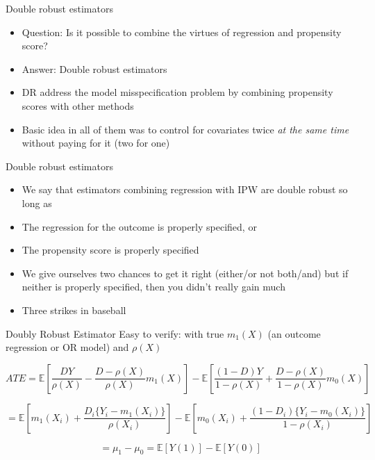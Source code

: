 \documentclass{beamer}
\begin{document}
\begin{frame}{Double robust estimators}

\begin{itemize}
\item Question: Is it possible to combine the virtues of regression and propensity score?
\item Answer: Double robust estimators
\item DR address the model misspecification problem by combining propensity scores with other methods 
\item Basic idea in all of them was to control for covariates twice \emph{at the same time} without paying for it (two for one)
\end{itemize}

\end{frame}

\begin{frame}{Double robust estimators}

\begin{itemize}
\item We say that estimators combining regression with IPW are double robust so long as
	\item The regression for the outcome is properly specified, or
	\item The propensity score is properly specified
\item We give ourselves two chances to get it right (either/or not both/and) but if neither is properly specified, then you didn't really gain much
\item Three strikes in baseball
\end{itemize}

\end{frame}

\begin{frame}{Doubly Robust Estimator}
    Easy to verify: with true \( m_1(X) \) (an outcome regression or OR model) and \( \rho(X) \)
\footnotesize

    \[
    ATE = \mathbb{E} \left[ \frac{DY}{\rho(X)} - \frac{D - \rho(X)}{\rho(X)}m_1(X) \right]
    - \mathbb{E} \left[ \frac{(1 - D)Y}{1 - \rho(X)} + \frac{D - \rho(X)}{1 - \rho(X)}m_0(X) \right]
    \]

    \[
    = \mathbb{E} \left[ m_1(X_i) + \frac{D_i\{Y_i - m_1(X_i)\}}{\rho(X_i)} \right]
    - \mathbb{E} \left[ m_0(X_i) + \frac{(1 - D_i)\{Y_i - m_0(X_i)\}}{1 - \rho(X_i)} \right]
    \]

    \[
    = \mu_1 - \mu_0 = \mathbb{E}[Y(1)] - \mathbb{E}[Y(0)]
    \]
\end{frame}
\end{document}

